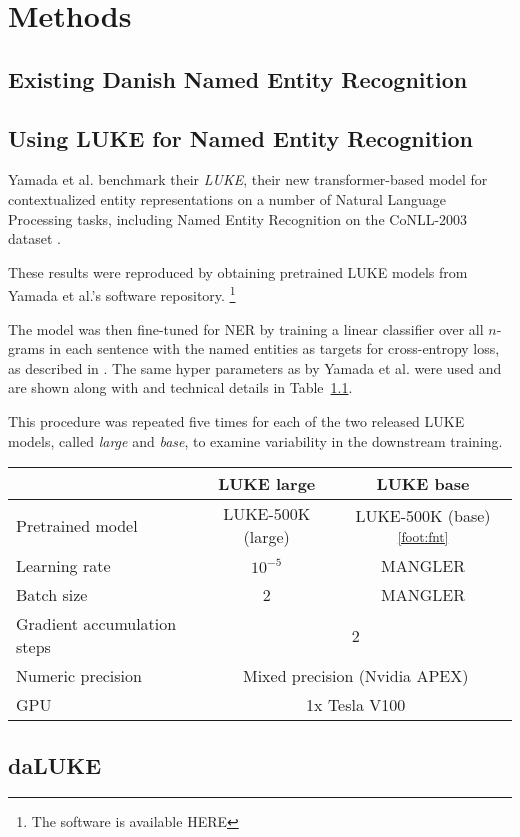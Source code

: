 \documentclass[main.tex]{subfiles}
\begin{document}
\chapter{Methods}

\section{Existing Danish Named Entity Recognition}

\section{Using LUKE for Named Entity Recognition}
Yamada et al. benchmark their \emph{LUKE}, their new transformer-based model for contextualized entity representations on a number of Natural Language Processing tasks, including Named Entity Recognition on the CoNLL-2003 dataset \cite{yamada2020luke}.

These results were reproduced by obtaining pretrained LUKE models from Yamada et al.'s software repository. \footnote{The software is available HERE}

The model was then fine-tuned for NER by training a linear classifier over all $n$-grams in each sentence with the named entities as targets for cross-entropy loss, as described in \cite[4.3]{yamada2020luke}.
The same hyper parameters as by Yamada et al. were used and are shown along with and technical details in Table~\ref{tab:params}.

This procedure was repeated five times for each of the two released LUKE models, called \emph{large} and \emph{base}, to examine variability in the downstream training.
\begin{table}
    \begin{tabular}{l|cc}
            & LUKE large & LUKE base\\\hline
        Pretrained model  & LUKE-500K (large)
        \protect\footnotemark& LUKE-500K (base)\textsuperscript{\ref{foot:fnt}}\\
        Learning rate               & $10^{-5}$ & MANGLER\\
        Batch size                  & 2    & MANGLER\\
        Gradient accumulation steps & \multicolumn{2}{c}{2}\\
        Numeric precision           & \multicolumn{2}{c}{Mixed precision (Nvidia APEX)}\\
        GPU                         & \multicolumn{2}{c}{1x Tesla V100}
    \end{tabular}
    \label{tab:params}
\end{table}

\cite{yamada2020luke}
\section{daLUKE}
\end{document}
